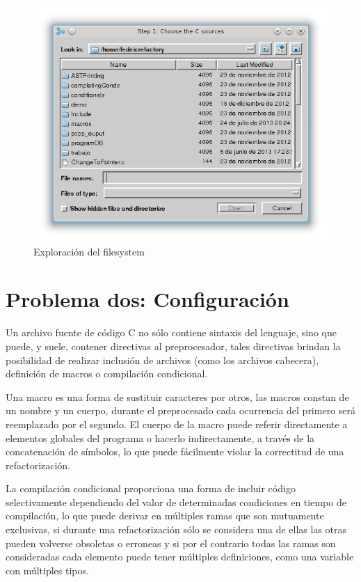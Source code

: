 \documentclass[a4paper,oneside,12pt]{article}
\begin{document}
\begin{figure}[h!]
  \centering
    \includegraphics[scale=0.50]{images/codigo_modificado/open_file.png}
     \caption{Exploraci\'on del filesystem}
     \label{busqueda_archivo}
\end{figure}

\section{Problema dos: Configuraci\'on}
\label{sec:problema_dos}

Un archivo fuente de c\'odigo C no s\'olo contiene sintaxis del lenguaje, sino que puede, y suele, contener directivas al preprocesador, tales directivas brindan la posibilidad de realizar inclusi\'on de archivos (como los archivos cabecera), definici\'on de macros o compilaci\'on condicional.

Una macro es una forma de sustituir caracteres por otros, las macros constan de un nombre y un cuerpo, durante el preprocesado cada ocurrencia del primero ser\'a reemplazado por el segundo. El cuerpo de la macro puede referir directamente a elementos globales del programa o hacerlo indirectamente, a trav\'es de la concatenaci\'on de s\'imbolos, lo que puede f\'acilmente violar la correctitud de una refactorizaci\'on.

La compilaci\'on condicional proporciona una forma de incluir c\'odigo selectivamente dependiendo del valor de determinadas condiciones en tiempo de compilaci\'on, lo que puede derivar en m\'ultiples ramas que son mutuamente exclusivas, si durante una refactorizaci\'on s\'olo se considera una de ellas las otras pueden volverse obsoletas o erroneas y si por el contrario todas las ramas son consideradas cada elemento puede tener m\'ultiples definiciones, como una variable con m\'ultiples tipos.
\end{document}
